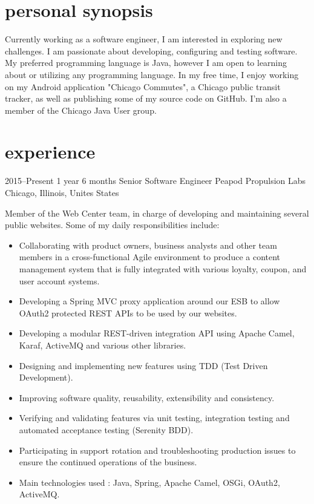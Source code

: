 \documentclass[]{friggeri-cv} %
\begin{document}
\section{personal synopsis}

Currently working as a software engineer, I am interested in exploring new challenges. I am passionate about developing, configuring and testing software. My preferred programming language is Java, however I am open to learning about or utilizing any programming language. In my free time, I enjoy working on my Android application "Chicago Commutes", a Chicago public transit tracker, as well as publishing some of my source code on GitHub. I'm also a member of the Chicago Java User group.



\section{experience}


\begin{entrylist}

\entry
{2015--Present}
{1 year 6 months}
{Senior Software Engineer} 
{Peapod Propulsion Labs}
{Chicago, Illinois, Unites States}
{Member of the Web Center team, in charge of developing and maintaining several public websites. Some of my daily responsibilities include:\\
\vspace{-4mm}
\begin{itemize}
	\item Collaborating with product owners, business analysts and other team members in a cross-functional Agile environment to produce a content management system that is fully integrated with various loyalty, coupon, and user account systems.
		\item Developing a Spring MVC proxy application around our ESB to allow OAuth2 protected REST APIs to be used by our websites.
	\item Developing a modular REST-driven integration API using Apache Camel, Karaf, ActiveMQ and various other libraries.
	\item Designing and implementing new features using TDD (Test Driven Development).
	\item Improving software quality, reusability, extensibility and consistency.
	\item Verifying and validating features via unit testing, integration testing and automated acceptance testing (Serenity BDD).
	\item Participating in support rotation and troubleshooting production issues to ensure the continued operations of the business.
	\item Main technologies used : Java, Spring, Apache Camel, OSGi, OAuth2, ActiveMQ.
\end{itemize}
}
\vspace{-7mm}

\end{entrylist}
\end{document}
